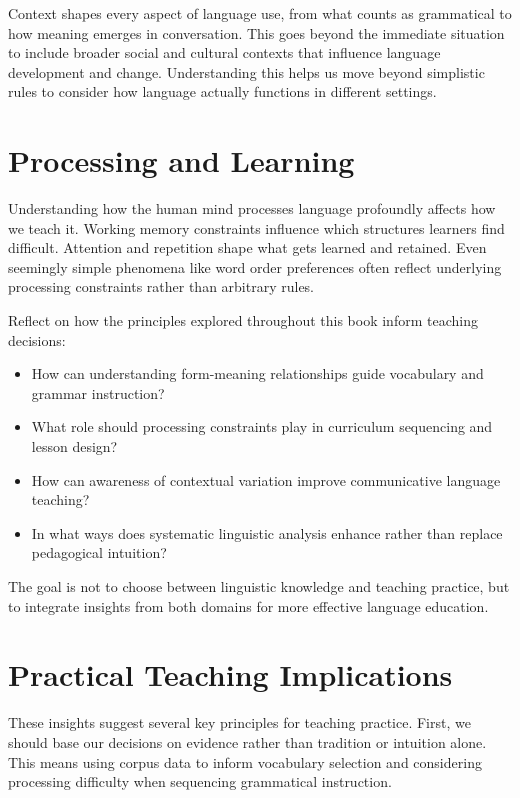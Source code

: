 Context shapes every aspect of language use, from what counts as grammatical to how meaning emerges in conversation. This goes beyond the immediate situation to include broader social and cultural contexts that influence language development and change. Understanding this helps us move beyond simplistic rules to consider how language actually functions in different settings.

\section*{Processing and Learning}

Understanding how the human mind processes language profoundly affects how we teach it. Working memory constraints influence which structures learners find difficult. Attention and repetition shape what gets learned and retained. Even seemingly simple phenomena like word order preferences often reflect underlying processing constraints rather than arbitrary rules.

\begin{tcolorbox}[title=Synthesis: Integrating Linguistic Insights into Teaching Practice, colback=blue!10!white, colframe=blue!75!black]
Reflect on how the principles explored throughout this book inform teaching decisions:
\begin{itemize}[noitemsep]
    \item How can understanding form-meaning relationships guide vocabulary and grammar instruction?
    \item What role should processing constraints play in curriculum sequencing and lesson design?
    \item How can awareness of contextual variation improve communicative language teaching?
    \item In what ways does systematic linguistic analysis enhance rather than replace pedagogical intuition?
\end{itemize}
The goal is not to choose between linguistic knowledge and teaching practice, but to integrate insights from both domains for more effective language education.
\end{tcolorbox}

\section*{Practical Teaching Implications}

These insights suggest several key principles for teaching practice. First, we should base our decisions on evidence rather than tradition or intuition alone. This means using corpus data to inform vocabulary selection and considering processing difficulty when sequencing grammatical instruction.

